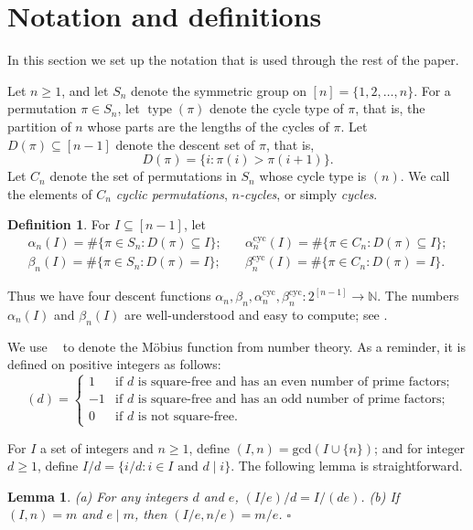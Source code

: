 \documentclass[12pt]{article}
\newcommand{\Perm}{S}
\newcommand{\Cyc}{C}
\newcommand{\alphacyc}{\alpha^{\text{cyc}}}
\newcommand{\betacyc}{\beta^{\text{cyc}}}
\DeclareMathOperator{\mob}{M\ddot{o}b}
\DeclareMathOperator{\type}{type}
\newtheorem{lem}[thm]{Lemma}
\theoremstyle{definition}
\newtheorem{defn}[thm]{Definition}
\begin{document}
\section{Notation and definitions} \label{NotationSection}

In this section we set up the notation that is used through the rest of the paper.

Let $n\ge1$, and let $\Perm_n$ denote the symmetric group on $[n]=\{1,2,\dots,n\}$. For a permutation  $\pi \in \Perm_n$, let $\type(\pi)$ denote the cycle type of $\pi$, that is, the partition of $n$ whose parts are the lengths of the cycles of $\pi$.
Let $D(\pi) \subseteq [n-1]$ denote the descent set of $\pi$, that is,
\[ D(\pi) = \{i \colon \pi(i) > \pi(i+1)\}. \]
Let $\Cyc_n$ denote the set of permutations in $\Perm_n$ whose cycle type is $(n)$. We call the elements of $\Cyc_n$ {\em cyclic permutations}, {\em $n$-cycles}, or simply {\em cycles}. 
\begin{defn} For $I \subseteq [n-1]$, let
\[ \begin{matrix}
\alpha_n(I) = \#\{\pi \in \Perm_n \colon D(\pi) \subseteq I\}; \quad & \alphacyc_n(I) = \#\{\pi \in \Cyc_n \colon D(\pi) \subseteq I\}; \\
\beta_n(I) = \#\{\pi \in \Perm_n \colon D(\pi) = I\}; \quad & \betacyc_n(I) = \#\{\pi \in \Cyc_n \colon D(\pi) = I\}.
\end{matrix}\]
\end{defn}
Thus we have four descent functions $\alpha_n, \beta_n, \alphacyc_n, \betacyc_n \colon 2^{[n-1]} \to \mathbb{N}$. The numbers $\alpha_n(I)$ and $\beta_n(I)$ are well-understood and easy to compute; see \cite[Sec.\ 1.4 \& Example 2.2.4]{Stanley1}.

We use $\mob$ to denote the M\"obius function from number theory. As a reminder, it is defined on positive integers as follows:
\[ \mob(d) = \begin{cases} 1 & \text{if $d$ is square-free and has an even number of prime factors}; \\
-1 & \text{if $d$ is square-free and has an odd number of prime factors}; \\
0 & \text{if $d$ is not square-free}.
\end{cases} \]

For $I$ a set of integers and $n\ge1$, define $(I,n) = \text{gcd}(I \cup \{n\})$; and for integer $d \ge 1$, define $I/d = \{i/d \colon \text{$i \in I$ and $d\mid i$}\}$. The following lemma is straightforward.

\begin{lem} \label{basiclemma} (a) For any integers $d$ and $e$, $(I/e)/d = I/(de)$. (b) If $(I,n) = m$ and $e \mid m$, then $(I/e, n/e) = m/e$. \hfill $\square$
\end{lem}
\end{document}
